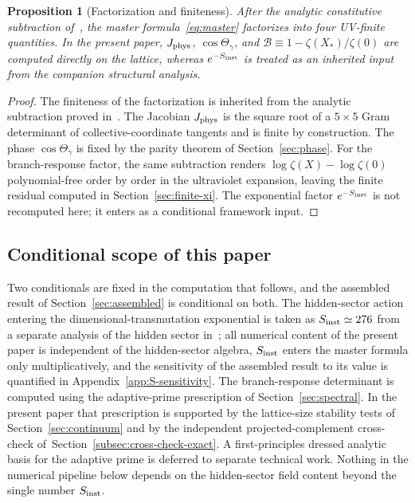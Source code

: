 \documentclass[a4paper,11pt]{article}
\newtheorem{proposition}[theorem]{Proposition}
\theoremstyle{definition}
\newcommand{\Jphys}{J_{\rm phys}}
\newcommand{\Bobs}{\mathcal{B}}
\begin{document}
\begin{proposition}[Factorization and finiteness]
\label{prop:factor-partition}
After the analytic constitutive subtraction
of~\cite{companion-structural}, the master formula~\eqref{eq:master}
factorizes into four UV-finite quantities. In the present paper,
$\Jphys$, $\cos\Theta_\gamma$, and
$\Bobs \equiv 1 - \zeta(X_*)/\zeta(0)$ are computed directly on the
lattice, whereas $e^{-S_{\rm inst}}$ is treated as an inherited input
from the companion structural analysis.
\end{proposition}

\begin{proof}
The finiteness of the factorization is inherited from the analytic
subtraction proved in~\cite{companion-structural}. The Jacobian
$\Jphys$ is the square root of a $5\times 5$ Gram determinant of
collective-coordinate tangents and is finite by construction. The
phase $\cos\Theta_\gamma$ is fixed by the parity theorem of
Section~\ref{sec:phase}. For the branch-response factor, the same
subtraction renders $\log\zeta(X) - \log\zeta(0)$ polynomial-free
order by order in the ultraviolet expansion, leaving the finite
residual computed in Section~\ref{sec:finite-xi}. The exponential
factor $e^{-S_{\rm inst}}$ is not recomputed here; it enters as a
conditional framework input.
\end{proof}

\subsection{Conditional scope of this paper}
\label{subsec:framework-scope}

Two conditionals are fixed in the computation that follows, and the
assembled result of Section~\ref{sec:assembled} is conditional on
both. The hidden-sector action entering the dimensional-transmutation
exponential is taken as $S_{\rm inst} \simeq 276$ from a separate
analysis of the hidden sector in~\cite{companion-structural}; all
numerical content of the present paper is independent of the
hidden-sector algebra, $S_{\rm inst}$ enters the master formula only
multiplicatively, and the sensitivity of the assembled result to its
value is quantified in Appendix~\ref{app:S-sensitivity}. The
branch-response determinant is computed using the adaptive-prime
prescription of Section~\ref{sec:spectral}. In the present paper that
prescription is supported by the lattice-size stability tests of
Section~\ref{sec:continuum} and by the independent
projected-complement cross-check
of~Section~\ref{subsec:cross-check-exact}. A first-principles dressed
analytic basis for the adaptive prime is deferred to separate
technical work. Nothing in the numerical pipeline below depends on
the hidden-sector field content beyond the single number
$S_{\rm inst}$.
\end{document}
